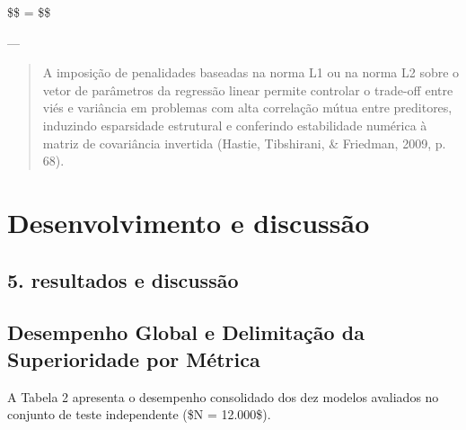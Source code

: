 \documentclass[12pt,a4paper]{article}
\begin{document}
\$\$ =  \$\$

---

\begin{quote}
\small A imposição de penalidades baseadas na norma L1 ou na norma L2 sobre o vetor de parâmetros da regressão linear permite controlar o trade-off entre viés e variância em problemas com alta correlação mútua entre preditores, induzindo esparsidade estrutural e conferindo estabilidade numérica à matriz de covariância invertida (Hastie, Tibshirani, \& Friedman, 2009, p. 68).
\end{quote}


\section{Desenvolvimento e discussão}


\subsection{5. resultados e discussão}


\subsection{Desempenho Global e Delimitação da Superioridade por Métrica}

A Tabela 2 apresenta o desempenho consolidado dos dez modelos avaliados no conjunto de teste independente (\$N = 12.000\$).
\end{document}
